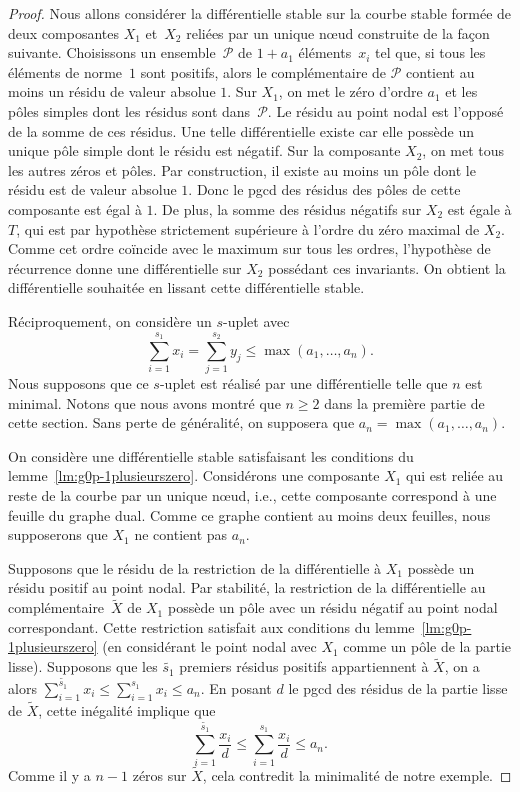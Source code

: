 \documentclass[11pt]{article}
\newcommand{\ie}{i.e.,\xspace}
\numberwithin{equation}{section}\renewcommand{\proofname}{Démonstration}
\let\mathcal\mathscr
\theoremstyle{definition}
\begin{document}
\begin{proof}
Nous allons considérer la différentielle stable sur la courbe stable formée de deux composantes $X_{1}$ et~$X_{2}$ reliées par un unique nœud construite de la façon suivante. Choisissons un ensemble~$\mathcal{P}$ de $1 + a_1$ éléments~$x_{i}$ tel que, si tous les éléments de norme~$1$ sont positifs, alors le complémentaire de $\mathcal{P}$ contient au moins un résidu de valeur absolue $1$. Sur $X_1$, on met le zéro d’ordre $a_1$ et les pôles simples dont les résidus sont dans~$\mathcal{P}$. Le résidu au point nodal est l'opposé de la somme de ces résidus. Une telle différentielle existe car elle possède un unique pôle simple dont
le résidu est négatif. Sur la composante $X_2$, on met tous les autres zéros et pôles. Par construction, il existe au moins un pôle dont le résidu est de valeur absolue $1$. Donc le pgcd des résidus des pôles de cette composante est égal à $1$. De plus, la somme des résidus négatifs sur $X_{2}$ est égale à $T$, qui est par hypothèse strictement
supérieure à l'ordre du zéro maximal de $X_{2}$. Comme cet ordre coïncide avec le maximum sur tous les ordres, l’hypothèse de récurrence donne une différentielle sur $X_{2}$ possédant ces invariants. On obtient la différentielle souhaitée en lissant cette différentielle stable.

Réciproquement, on considère un $s$-uplet avec\vspace*{-3pt}
\[
\sum_{i=1}^{s_{1}} x_{i} = \sum_{j=1}^{s_{2}} y_{j} \leq \max(a_{1},\dots,a_{n}).
\]
Nous supposons que ce $s$-uplet est réalisé par une différentielle telle que $n$ est minimal. Notons que nous avons montré que $n\geq2$ dans la première partie de cette section. Sans perte de généralité, on supposera que $a_{n}= \max(a_{1},\dots,a_{n})$.

On considère une différentielle stable satisfaisant les conditions du lemme~\ref{lm:g0p-1plusieurszero}. Considérons une composante $X_{1}$ qui est reliée au reste de la courbe par un unique nœud, \ie cette composante correspond à une feuille du graphe dual. Comme ce graphe contient au moins deux feuilles, nous supposerons que $X_{1}$ ne contient pas $a_{n}$.

Supposons que le résidu de la restriction de la différentielle à $X_{1}$ possède un résidu positif au point nodal. Par stabilité, la restriction de la différentielle au complémentaire~$\tilde X$ de $X_{1}$ possède un pôle avec un résidu négatif au point nodal correspondant. Cette restriction satisfait aux conditions du lemme~\ref{lm:g0p-1plusieurszero} (en considérant le point nodal avec $X_{1}$ comme un pôle de la partie lisse). Supposons que les $\tilde{s_{1}}$ premiers résidus positifs appartiennent à $\tilde X$, on a alors $\sum_{i=1}^{\tilde{s_{1}}} x_{i} \leq \sum_{i=1}^{s_{1}} x_{i} \leq a_{n}$. En posant $d$ le pgcd des résidus de la partie lisse de $\tilde{X}$, cette inégalité implique que\vspace*{-3pt}
\[
\sum_{i=1}^{\tilde{s_{1}}} \frac{x_{i}}{d} \leq \sum_{i=1}^{s_{1}} \frac{x_{i}}{d} \leq a_{n}.
\]
Comme il y a $n-1$ zéros sur $\tilde X$, cela contredit la minimalité de notre exemple.
\end{proof}
\end{document}
